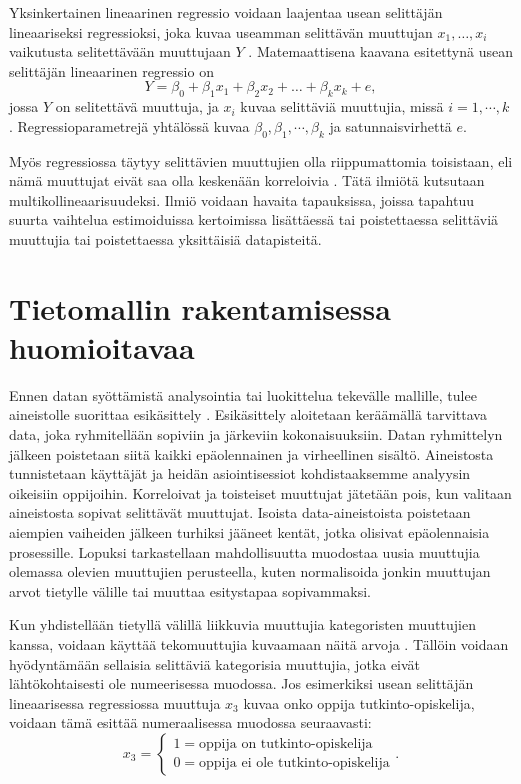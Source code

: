Yksinkertainen lineaarinen regressio voidaan laajentaa usean selittäjän lineaariseksi regressioksi, joka kuvaa useamman selittävän muuttujan $x_1, \ldots, x_i$ vaikutusta selitettävään muuttujaan $Y$ \citep{rossIntroductoryStatistics2017}. Matemaattisena kaavana esitettynä usean selittäjän lineaarinen regressio on $$Y = \beta_0 + \beta_1x_1 + \beta_2x_2 + \ldots + \beta_kx_k + e,$$ jossa $Y$ on selitettävä muuttuja, ja $x_i$ kuvaa selittäviä muuttujia, missä $i = 1, \cdots, k$. Regressioparametrejä yhtälössä kuvaa $\beta_0, \beta_1, \cdots, \beta_k$ ja satunnaisvirhettä $e$.

Myös regressiossa täytyy selittävien muuttujien olla riippumattomia toisistaan, eli nämä muuttujat eivät saa olla keskenään korreloivia \citep{daoudMulticollinearityRegressionAnalysis2017}. Tätä ilmiötä kutsutaan multikollineaarisuudeksi. Ilmiö voidaan havaita tapauksissa, joissa tapahtuu suurta vaihtelua estimoiduissa kertoimissa lisättäessä tai poistettaessa selittäviä muuttujia tai poistettaessa yksittäisiä datapisteitä.

\section{Tietomallin rakentamisessa huomioitavaa}
Ennen datan syöttämistä analysointia tai luokittelua tekevälle mallille, tulee aineistolle suorittaa esikäsittely \citep{romeroSurveyPreProcessingEducational2014}. Esikäsittely aloitetaan keräämällä tarvittava data, joka ryhmitellään sopiviin ja järkeviin kokonaisuuksiin. Datan ryhmittelyn jälkeen poistetaan siitä kaikki epäolennainen ja virheellinen sisältö. Aineistosta tunnistetaan käyttäjät ja heidän asiointisessiot kohdistaaksemme analyysin oikeisiin oppijoihin. Korreloivat ja toisteiset muuttujat jätetään pois, kun valitaan aineistosta sopivat selittävät muuttujat. Isoista data-aineistoista poistetaan aiempien vaiheiden jälkeen turhiksi jääneet kentät, jotka olisivat epäolennaisia prosessille. Lopuksi tarkastellaan mahdollisuutta muodostaa uusia muuttujia olemassa olevien muuttujien perusteella, kuten normalisoida jonkin muuttujan arvot tietylle välille tai muuttaa esitystapaa sopivammaksi.

Kun yhdistellään tietyllä välillä liikkuvia muuttujia kategoristen muuttujien kanssa, voidaan käyttää tekomuuttujia kuvaamaan näitä arvoja \citep{rossIntroductoryStatistics2017}. Tällöin voidaan hyödyntämään sellaisia selittäviä kategorisia muuttujia, jotka eivät lähtökohtaisesti ole numeerisessa muodossa. Jos esimerkiksi usean selittäjän lineaarisessa regressiossa muuttuja $x_3$ kuvaa onko oppija tutkinto-opiskelija, voidaan tämä esittää numeraalisessa muodossa seuraavasti: $$x_3 = \begin{cases}1 = \text{oppija on tutkinto-opiskelija} \\ 0 = \text{oppija ei ole tutkinto-opiskelija}\end{cases}.$$

